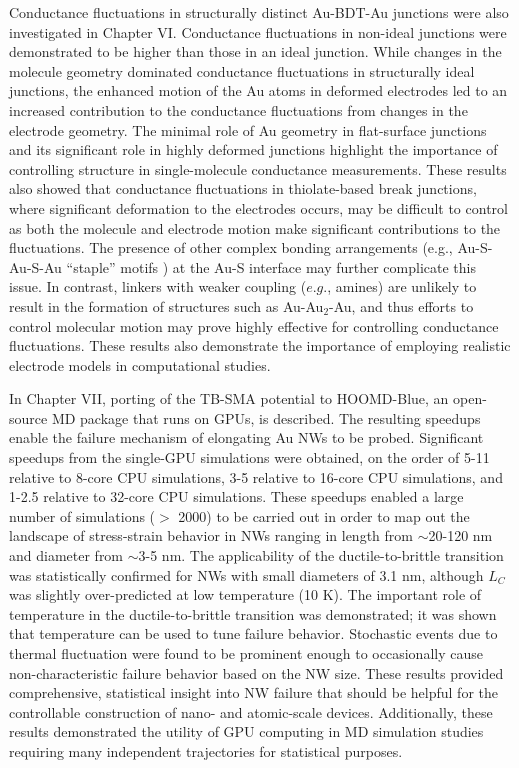 \documentclass[10pt]{report}  %
\begin{document}
Conductance fluctuations in structurally distinct Au-BDT-Au junctions were also investigated in Chapter VI. Conductance fluctuations in non-ideal junctions were demonstrated to be higher than those in an ideal junction. While changes in the molecule geometry dominated conductance fluctuations in structurally ideal junctions, the enhanced motion of the Au atoms in deformed electrodes led to an increased contribution to the conductance fluctuations from changes in the electrode geometry. The minimal role of Au geometry in flat-surface junctions and its significant role in highly deformed junctions highlight the importance of controlling structure in single-molecule conductance measurements. These results also showed that conductance fluctuations in thiolate-based break junctions, where significant deformation to the electrodes occurs, \cite{Frei:2012,Arroyo:2011,Huang:2007} may be difficult to control as both the molecule and electrode motion make significant contributions to the fluctuations. The presence of other complex bonding arrangements (e.g., Au-S-Au-S-Au ``staple'' motifs \cite{Cossaro:2008}) at the Au-S interface may further complicate this issue. \cite{Hakkinen:2012,Strange:2010} In contrast, linkers with weaker coupling ($e.g.$, amines) are unlikely to result in the formation of structures such as Au-Au$_{2}$-Au, and thus efforts to control molecular motion \cite{Kiguchi:2012} may prove highly effective for controlling conductance fluctuations. These results also demonstrate the importance of employing realistic electrode models in computational studies.

In Chapter VII, porting of the TB-SMA potential to HOOMD-Blue, an open-source MD package that runs on GPUs, is described. The resulting speedups enable the failure mechanism of elongating Au NWs to be probed. Significant speedups from the single-GPU simulations were obtained, on the order of 5-11 relative to 8-core CPU simulations, 3-5 relative to 16-core CPU simulations, and 1-2.5 relative to 32-core CPU simulations. These speedups enabled a large number of simulations ($>$ 2000) to be carried out in order to map out the landscape of stress-strain behavior in NWs ranging in length from $\sim$20-120 nm and diameter from $\sim$3-5 nm. The applicability of the ductile-to-brittle transition was statistically confirmed for NWs with small diameters of 3.1 nm, although $L_{C}$ was slightly over-predicted at low temperature (10 K). The important role of temperature in the ductile-to-brittle transition was demonstrated; it was shown that temperature can be used to tune failure behavior. Stochastic events due to thermal fluctuation were found to be prominent enough to occasionally cause non-characteristic failure behavior based on the NW size. These results provided comprehensive, statistical insight into NW failure that should be helpful for the controllable construction of nano- and atomic-scale devices. Additionally, these results demonstrated the utility of GPU computing in MD simulation studies requiring many independent trajectories for statistical purposes.
\end{document}
